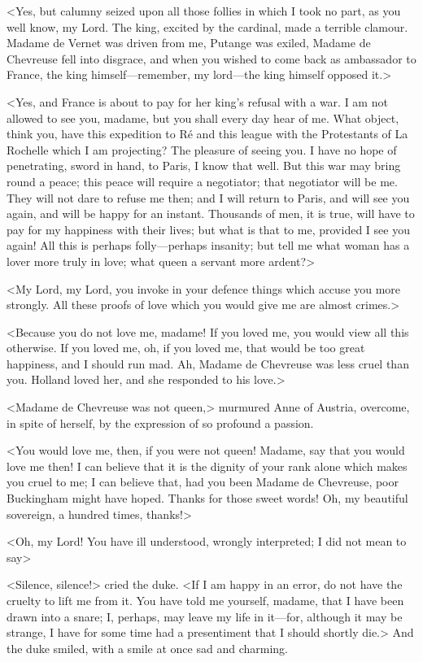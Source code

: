 <Yes, but calumny seized upon all those follies in which I took no part, as you well know, my Lord. The king, excited by the cardinal, made a terrible clamour. Madame de Vernet was driven from me, Putange was exiled, Madame de Chevreuse fell into disgrace, and when you wished to come back as ambassador to France, the king himself—remember, my lord—the king himself opposed it.> 

<Yes, and France is about to pay for her king's refusal with a war. I am not allowed to see you, madame, but you shall every day hear of me. What object, think you, have this expedition to Ré and this league with the Protestants of La Rochelle which I am projecting? The pleasure of seeing you. I have no hope of penetrating, sword in hand, to Paris, I know that well. But this war may bring round a peace; this peace will require a negotiator; that negotiator will be me. They will not dare to refuse me then; and I will return to Paris, and will see you again, and will be happy for an instant. Thousands of men, it is true, will have to pay for my happiness with their lives; but what is that to me, provided I see you again! All this is perhaps folly—perhaps insanity; but tell me what woman has a lover more truly in love; what queen a servant more ardent?> 

<My Lord, my Lord, you invoke in your defence things which accuse you more strongly. All these proofs of love which you would give me are almost crimes.> 

<Because you do not love me, madame! If you loved me, you would view all this otherwise. If you loved me, oh, if you loved me, that would be too great happiness, and I should run mad. Ah, Madame de Chevreuse was less cruel than you. Holland loved her, and she responded to his love.> 

<Madame de Chevreuse was not queen,> murmured Anne of Austria, overcome, in spite of herself, by the expression of so profound a passion. 

<You would love me, then, if you were not queen! Madame, say that you would love me then! I can believe that it is the dignity of your rank alone which makes you cruel to me; I can believe that, had you been Madame de Chevreuse, poor Buckingham might have hoped. Thanks for those sweet words! Oh, my beautiful sovereign, a hundred times, thanks!> 

<Oh, my Lord! You have ill understood, wrongly interpreted; I did not mean to say\longdash> 

<Silence, silence!> cried the duke. <If I am happy in an error, do not have the cruelty to lift me from it. You have told me yourself, madame, that I have been drawn into a snare; I, perhaps, may leave my life in it—for, although it may be strange, I have for some time had a presentiment that I should shortly die.> And the duke smiled, with a smile at once sad and charming. 

